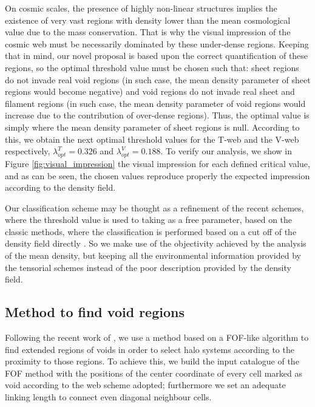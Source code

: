 \documentclass[usenatbib]{latex/mn2e}
\begin{document}
On cosmic scales, the presence of highly non-linear structures implies the 
existence of very vast regions with density lower than the mean 
cosmological value due to the mass conservation. That is why the visual 
impression of the cosmic web must be necessarily dominated by these 
under-dense regions. Keeping that in mind, our novel proposal is based upon
the correct quantification of these regions, so the optimal threshold 
value must be chosen such that: sheet regions do not invade real void 
regions (in such case, the mean density parameter of sheet regions would 
become negative) and void regions do not invade real sheet and filament 
regions (in such case, the mean density parameter of void regions would 
increase due to the contribution of over-dense regions). Thus, the optimal 
value is simply where the mean density parameter of sheet regions is 
null. According to this, we obtain the next optimal threshold values 
for the T-web and the V-web respectively, $\lambda_{opt}^T = 0.326$ and 
$\lambda_{opt}^V = 0.188$. To verify our analysis, we show in Figure 
\ref{fig:visual_impression} the visual impression for each defined critical 
value, and as can be seen, the chosen values reproduce properly the 
expected impression according to the density field. 



Our classification scheme may be thought as a refinement of the recent 
schemes, where the threshold value is used to taking as a free parameter, 
based on the classic methods, where the classification is performed 
based on a cut off of the density field directly .
So we make use of the objectivity achieved by the analysis of the mean 
density, but keeping all the environmental information provided by the
tensorial schemes instead of the poor description provided by the density 
field.



\subsection{Method to find void regions}
\label{subsec:method_voids}



Following the recent work of , we use a method 
based on a FOF-like algorithm to find extended regions of voids in order 
to select halo systems according to the proximity to those regions. 
To achieve this, we build the input catalogue of the FOF method with the 
positions of the center coordinate of every cell marked as void according 
to the web scheme adopted; furthermore we set an adequate linking length 
to connect even diagonal neighbour cells.
\end{document}
